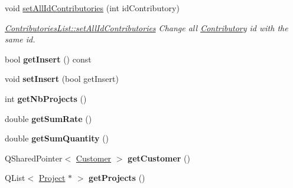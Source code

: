 \begin{DoxyCompactItemize}
\item 
void \hyperlink{classModels_1_1ContributoriesList_a313800788580eb469df125fe8d47c6a6}{set\-All\-Id\-Contributories} (int id\-Contributory)
\begin{DoxyCompactList}\small\item\em \hyperlink{classModels_1_1ContributoriesList_a313800788580eb469df125fe8d47c6a6}{Contributories\-List\-::set\-All\-Id\-Contributories} Change all \hyperlink{classModels_1_1Contributory}{Contributory} id with the same id. \end{DoxyCompactList}\item 
\hypertarget{classModels_1_1ContributoriesList_ab5b32ef1b153af303852d10b0168a41f}{bool {\bfseries get\-Insert} () const }\label{classModels_1_1ContributoriesList_ab5b32ef1b153af303852d10b0168a41f}

\item 
\hypertarget{classModels_1_1ContributoriesList_a543e4e70e7b10efc05027108247c3958}{void {\bfseries set\-Insert} (bool get\-Insert)}\label{classModels_1_1ContributoriesList_a543e4e70e7b10efc05027108247c3958}

\item 
\hypertarget{classModels_1_1ContributoriesList_a026202989560ff9d462d6104b3788657}{int {\bfseries get\-Nb\-Projects} ()}\label{classModels_1_1ContributoriesList_a026202989560ff9d462d6104b3788657}

\item 
\hypertarget{classModels_1_1ContributoriesList_ae2fd3ad53b082ee8adf3d0249e4f539b}{double {\bfseries get\-Sum\-Rate} ()}\label{classModels_1_1ContributoriesList_ae2fd3ad53b082ee8adf3d0249e4f539b}

\item 
\hypertarget{classModels_1_1ContributoriesList_af9b3b1b703cebeef552d058999ffcc4c}{double {\bfseries get\-Sum\-Quantity} ()}\label{classModels_1_1ContributoriesList_af9b3b1b703cebeef552d058999ffcc4c}

\item 
\hypertarget{classModels_1_1ContributoriesList_a760097b1c0d7822cfd3d4796d553fae9}{Q\-Shared\-Pointer$<$ \hyperlink{classModels_1_1Customer}{Customer} $>$ {\bfseries get\-Customer} ()}\label{classModels_1_1ContributoriesList_a760097b1c0d7822cfd3d4796d553fae9}

\item 
\hypertarget{classModels_1_1ContributoriesList_a4d52a35870cd9257ee3b5db75bd8ff25}{Q\-List$<$ \hyperlink{classModels_1_1Project}{Project} $\ast$ $>$ {\bfseries get\-Projects} ()}\label{classModels_1_1ContributoriesList_a4d52a35870cd9257ee3b5db75bd8ff25}


\end{DoxyCompactItemize}
